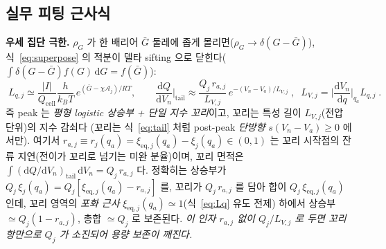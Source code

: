 \documentclass[11pt,a4paper]{article}
\newcommand{\dd}{\mathrm{d}}
\newcommand{\eq}{\mathrm{eq}}
\newcommand{\cell}{\mathrm{cell}}
\begin{document}
\subsection{실무 피팅 근사식}
\textbf{우세 집단 극한.} $\rho_G$ 가 한 배리어 $\bar G$ 둘레에 좁게 몰리면($\rho_G\to\delta(G-\bar G)$),
식~\eqref{eq:superpose} 의 적분이 델타 sifting 으로 닫힌다($\int\delta(G-\bar G)f(G)\,\dd G=f(\bar G)$):
\begin{equation}
\boxed{\;L_{q,j}\simeq\frac{|I|}{Q_\cell}\frac{h}{k_BT}\,e^{(\bar G-\chi\mathcal A_j)/RT},\qquad
\frac{\dd Q}{\dd V_n}\Big|_{\text{tail}}\approx\frac{Q_j\,r_{a,j}}{L_{V,j}}\,e^{-(V_n-V_a)/L_{V,j}}\;,\;\;
L_{V,j}=\Big|\frac{\dd V_n}{\dd q}\Big|_{q_a}L_{q,j}\;.}
\label{eq:simplefit}
\end{equation}
즉 peak 는 \emph{평형 logistic 상승부 + 단일 지수 꼬리}이고, 꼬리는 특성 길이 $L_{V,j}$(전압 단위)의 지수 감쇠다
(꼬리는 식~\eqref{eq:tail} 처럼 post-peak \emph{단방향} $s(V_n-V_a)\ge0$ 에서만).
여기서 $r_{a,j}\equiv r_j(q_a)=\xi_{\eq,j}(q_a)-\xi_j(q_a)\in(0,1)$ 는 꼬리 시작점의 잔류 지연(전이가 꼬리로 넘기는
미완 분율)이며, 꼬리 면적은 $\int(\dd Q/\dd V_n)_{\text{tail}}\,\dd V_n=Q_j\,r_{a,j}$ 다. 정확히는 상승부가
$Q_j\,\xi_j(q_a)=Q_j[\xi_{\eq,j}(q_a)-r_{a,j}]$ 를, 꼬리가 $Q_j\,r_{a,j}$ 를 담아 합이 $Q_j\,\xi_{\eq,j}(q_a)$ 인데,
꼬리 영역의 \emph{포화 근사} $\xi_{\eq,j}(q_a)\simeq1$(식~\eqref{eq:Lq} 유도 전제) 하에서 상승부 $\simeq Q_j(1-r_{a,j})$,
총합 $\simeq Q_j$ 로 보존된다. \emph{이 인자 $r_{a,j}$ 없이 $Q_j/L_{V,j}$ 로 두면 꼬리 항만으로 $Q_j$ 가 소진되어 용량 보존이 깨진다.}
\end{document}
